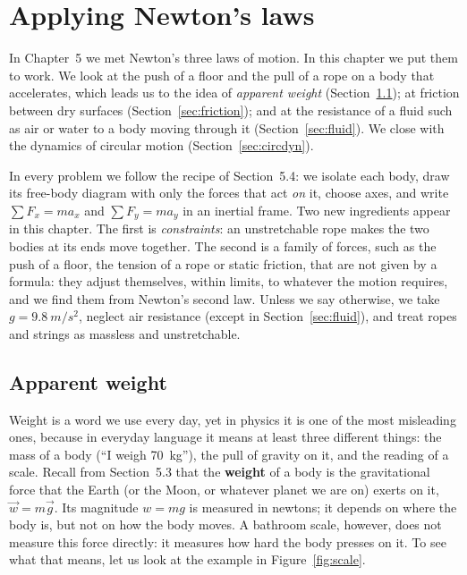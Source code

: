 \documentclass[11pt,a4paper]{article}
\begin{document}
\makenotetitle

\setcounter{section}{5}
\section{Applying Newton's laws}\label{sec:applying}

In Chapter~5 we met Newton's three laws of motion. In this chapter we put them to work. We look at
the push of a floor and the pull of a rope on a body that accelerates, which leads us to the idea
of \emph{apparent weight} (Section~\ref{sec:apparent}); at friction between dry surfaces
(Section~\ref{sec:friction}); and at the resistance of a fluid such as air or water to a body
moving through it (Section~\ref{sec:fluid}). We close with the dynamics of circular motion
(Section~\ref{sec:circdyn}).

In every problem we follow the recipe of Section~5.4: we isolate each body, draw its free-body
diagram with only the forces that act \emph{on} it, choose axes, and write $\sum F_x = m a_x$ and
$\sum F_y = m a_y$ in an inertial frame. Two new ingredients appear in this chapter. The first is
\emph{constraints}: an unstretchable rope makes the two bodies at its ends move together. The second
is a family of forces, such as the push of a floor, the tension of a rope or static friction, that
are not given by a formula: they adjust themselves, within limits, to whatever the motion requires,
and we find them from Newton's second law. Unless we say otherwise, we take
$g = \qty{9.8}{m/s^2}$, neglect air resistance (except in Section~\ref{sec:fluid}), and treat ropes
and strings as massless and unstretchable.

\subsection{Apparent weight}\label{sec:apparent}

Weight is a word we use every day, yet in physics it is one of the most misleading ones, because
in everyday language it means at least three different things: the mass of a body (``I weigh
\qty{70}{kg}''), the pull of gravity on it, and the reading of a scale. Recall from Section~5.3
that the \textbf{weight} of a body is the gravitational force that the Earth (or the Moon, or
whatever planet we are on) exerts on it, $\vec{w} = m\vec{g}$. Its magnitude $w = mg$ is measured in
newtons; it depends on where the body is, but not on how the body moves. A bathroom scale, however,
does not measure this force directly: it measures how hard the body presses on it. To see what
that means, let us look at the example in Figure~\ref{fig:scale}.
\end{document}
